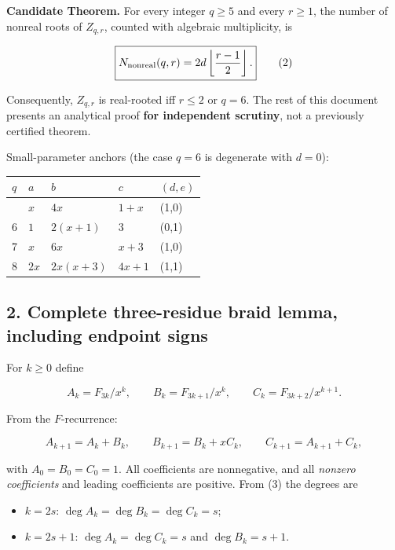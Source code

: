 \documentclass[
  10pt,
]{article}
\providecommand{\tightlist}{%
  \setlength{\itemsep}{0pt}\setlength{\parskip}{0pt}}
\begin{document}
\textbf{Candidate Theorem.} For every integer \(q\ge5\) and every
\(r\ge1\), the number of nonreal roots of \(Z_{q,r}\), counted with
algebraic multiplicity, is

\[
 \boxed{N_{\rm nonreal}(q,r)=2d\left\lfloor\frac{r-1}{2}\right\rfloor.}\tag{2}
\]

Consequently, \(Z_{q,r}\) is real-rooted iff \(r\le2\) or \(q=6\). The
rest of this document presents an analytical proof \textbf{for
independent scrutiny}, not a previously certified theorem.

Small-parameter anchors (the case \(q=6\) is degenerate with \(d=0\)):

\begin{longtable}[]{@{}lllll@{}}
\toprule\noalign{}
\(q\) & \(a\) & \(b\) & \(c\) & \((d,e)\) \\
\midrule\noalign{}
\endhead
\bottomrule\noalign{}
\endlastfoot
5 & \(x\) & \(4x\) & \(1+x\) & (1,0) \\
6 & \(1\) & \(2(x+1)\) & \(3\) & (0,1) \\
7 & \(x\) & \(6x\) & \(x+3\) & (1,0) \\
8 & \(2x\) & \(2x(x+3)\) & \(4x+1\) & (1,1) \\
\end{longtable}

\subsection{2. Complete three-residue braid lemma, including endpoint
signs}\label{complete-three-residue-braid-lemma-including-endpoint-signs}

For \(k\ge0\) define

\[
 A_k=F_{3k}/x^k,\qquad B_k=F_{3k+1}/x^k,\qquad C_k=F_{3k+2}/x^{k+1}.
\]

From the \(F\)-recurrence:

\[
 A_{k+1}=A_k+B_k,\qquad B_{k+1}=B_k+xC_k,\qquad C_{k+1}=A_{k+1}+C_k,
 \tag{3}
\]

with \(A_0=B_0=C_0=1\). All coefficients are nonnegative, and all
\emph{nonzero coefficients} and leading coefficients are positive. From
(3) the degrees are

\begin{itemize}
\tightlist
\item
  \(k=2s\): \(\deg A_k=\deg B_k=\deg C_k=s\);
\item
  \(k=2s+1\): \(\deg A_k=\deg C_k=s\) and \(\deg B_k=s+1\).
\end{itemize}
\end{document}
